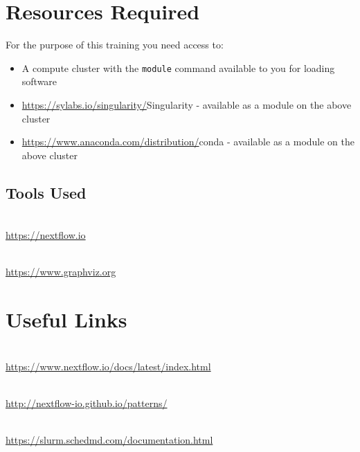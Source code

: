\section{Resources Required}

For the purpose of this training you need access to:

\begin{itemize}
  \item A compute cluster with the \texttt{module} command available to you for loading software
  \item \url{https://sylabs.io/singularity/}{Singularity} - available as a module on the above cluster
  \item \url{https://www.anaconda.com/distribution/}{conda} - available as a module on the above cluster
\end{itemize}


\subsection{Tools Used}
\begin{description}[style=multiline,labelindent=0cm,align=left,leftmargin=0.5cm]
  \item[Nextflow]\hfill\\
    \url{https://nextflow.io}
  \item[Graphviz]\hfill\\
    \url{https://www.graphviz.org}
\end{description}

\section{Useful Links}
 
\begin{description}[style=multiline,labelindent=0cm,align=left,leftmargin=0.5cm]
  \item[Nextflow Documentation]\hfill\\
    \url{https://www.nextflow.io/docs/latest/index.html}  
  \item[Nextflow Patterns]\hfill\\
    \url{http://nextflow-io.github.io/patterns/}  
  \item[Slurm Documentation]\hfill\\
    \url{https://slurm.schedmd.com/documentation.html}
  
\end{description}

